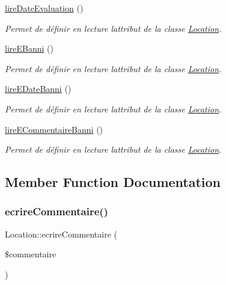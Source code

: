 \begin{DoxyCompactItemize}
\hyperlink{class_location_ab38a7d65891f8d40a4142878e1d9c8f9}{lire\+Date\+Evaluation} ()
\begin{DoxyCompactList}\small\item\em Permet de définir en lecture l\textquotesingle{}attribut de la classe \hyperlink{class_location}{Location}. \end{DoxyCompactList}\item 
\hyperlink{class_location_ab2595ab903c62276690d030b4b1d75e0}{lire\+E\+Banni} ()
\begin{DoxyCompactList}\small\item\em Permet de définir en lecture l\textquotesingle{}attribut de la classe \hyperlink{class_location}{Location}. \end{DoxyCompactList}\item 
\hyperlink{class_location_ac1331928786ec756180787ab12779b0b}{lire\+E\+Date\+Banni} ()
\begin{DoxyCompactList}\small\item\em Permet de définir en lecture l\textquotesingle{}attribut de la classe \hyperlink{class_location}{Location}. \end{DoxyCompactList}\item 
\hyperlink{class_location_a68be2be4f2d8da83b9d304a9132fc5b5}{lire\+E\+Commentaire\+Banni} ()
\begin{DoxyCompactList}\small\item\em Permet de définir en lecture l\textquotesingle{}attribut de la classe \hyperlink{class_location}{Location}. \end{DoxyCompactList}\end{DoxyCompactItemize}


\subsection{Member Function Documentation}
\mbox{\label{class_location_ac3587e0251d5f719a3a013813c8b4dd4}} 
\subsubsection{\texorpdfstring{ecrire\+Commentaire()}{ecrireCommentaire()}}
{\footnotesize\ttfamily Location\+::ecrire\+Commentaire (\begin{DoxyParamCaption}\item[{}]{\$commentaire }\end{DoxyParamCaption})}



